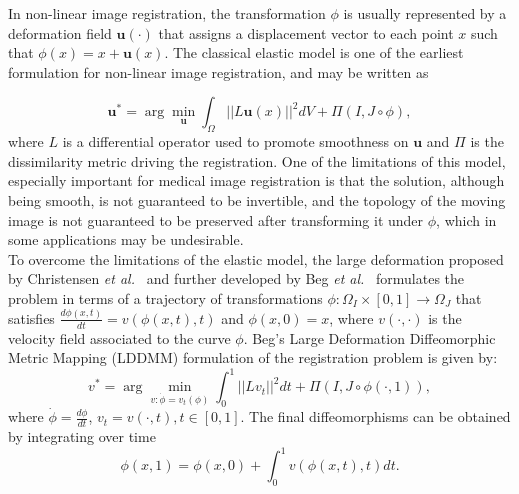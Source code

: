In non-linear image registration, the transformation $\phi$ is usually represented by a deformation field $\mathbf{u(\cdot)}$ that assigns a displacement vector
to each point $x$ such that $\phi(x) = x + \mathbf{u}(x)$. The classical elastic model is one of the earliest formulation for non-linear image registration,
and may be written as

\begin{equation}\label{eq:elastic}
    \mathbf{u}^{*} = \arg \min_{\mathbf{u}} \int_{\Omega} ||L \mathbf{u}(x)||^{2}dV + \Pi(I, J \circ \phi),
\end{equation}
where $L$ is a differential operator used to promote smoothness on $\mathbf{u}$ and $\Pi$ is the dissimilarity metric driving the registration. One of the limitations of this model, especially important for medical image registration is that the solution, although being smooth, is not guaranteed to be invertible, and the topology of the moving image is not guaranteed to be preserved after transforming it under $\phi$, which in some applications may be undesirable.\\

To overcome the limitations of the elastic model, the large deformation proposed by  Christensen {\it et al.}~\cite{Christensen2001} and further developed by Beg {\it et al.}~\cite{Science2005} formulates the problem in terms of a trajectory of transformations \hbox{$\phi:\Omega_{I} \times [0, 1] \rightarrow \Omega_{J}$} that satisfies $\frac{d \phi(x, t)}{dt} = v(\phi(x, t), t)$ and $\phi(x, 0) = x$, where $v(\cdot, \cdot)$ is
the velocity field associated to the curve $\phi$. Beg's Large Deformation Diffeomorphic Metric Mapping (LDDMM) \cite{Science2005} formulation of the registration problem is given by:
\begin{equation}\label{eq:LDDMM}
    v^{*} = \arg \min_{v:\dot{\phi} = v_{t}(\phi)} \int_{0}^{1} ||L v_{t}||^{2} dt + \Pi(I, J \circ \phi(\cdot, 1)),
\end{equation}
where $\dot{\phi} = \frac{d\phi}{dt}$, $v_{t} = v(\cdot, t), t\in [0, 1]$. The final diffeomorphisms can be obtained by integrating over time
\begin{equation}\label{eq:velocity_integral}
    \phi(x, 1) = \phi(x, 0) + \int_{0}^{1}v(\phi(x, t), t) dt.
\end{equation}

